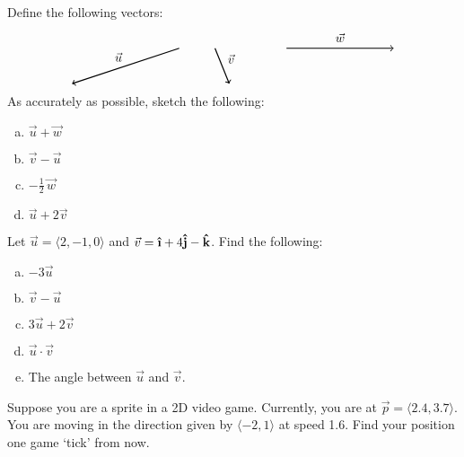 \documentclass[12pt,letterpaper]{exam}
\newcommand{\uveci}{{\bm{\hat{\textnormal{\bfseries\i}}}}}
\newcommand{\uvecj}{{\bm{\hat{\textnormal{\bfseries j}}}}}
\newcommand{\uveck}{{\bm{\hat{\textnormal{\bfseries k}}}}}
\begin{document}
\examtitle
{} 
\scores
\bottomline
\newpage

\begin{questions}

\newpage
\question[10] Define the following vectors:
	\[
	\begin{tikzpicture}
	\node at (-1.7,-0.25) {$\vec{u}$};
	\draw[line width=0.03cm,->] (0,0) -- (-3,-1);
	
	\tikzset{shift={(1,0)}}
	
	\node at (0.45,-0.3) {$\vec{v}$};
	\draw[line width=0.03cm,->] (0,0) -- (0.4,-1);
	
	\tikzset{shift={(2,0)}}
	
	\node at (1.5,0.3) {$\vec{w}$};
	\draw[line width=0.03cm,->] (0,0) -- (3,0);
	\end{tikzpicture}
	\]
As accurately as possible, sketch the following:
	\begin{enumerate}[(a)]
	\item $\vec{u} + \vec{w}$
	\item $\vec{v} - \vec{u}$
	\item $-\frac{1}{2}\, \vec{w}$
	\item $\vec{u} + 2 \vec{v}$
	\end{enumerate}



\newpage
\question[10] Let $\vec{u}= \langle 2, -1, 0 \rangle$ and $\vec{v}= \uveci + 4 \uvecj - \uveck$. Find the following:
	\begin{enumerate}[(a)]
	\item $-3 \vec{u}$
	\item $\vec{v} - \vec{u}$
	\item $3 \vec{u} + 2 \vec{v}$
	\item $\vec{u} \cdot \vec{v}$
	\item The angle between $\vec{u}$ and $\vec{v}$. 
	\end{enumerate}



\newpage
\question[10] Suppose you are a sprite in a 2D video game. Currently, you are at $\vec{p}= \langle 2.4, 3.7 \rangle$. You are moving in the direction given by $\langle -2, 1 \rangle$ at speed 1.6. Find your position one game `tick' from now. 




\end{questions}
\end{document}

